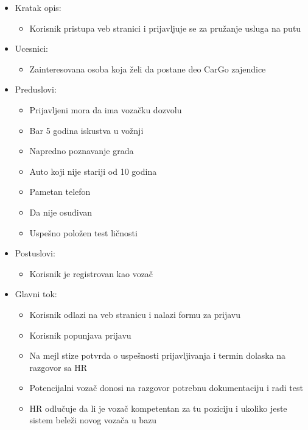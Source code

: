 \begin{itemize}
	\item Kratak opis:
		\begin{itemize}
			\item Korisnik pristupa veb stranici i prijavljuje se za pružanje usluga na putu
		\end{itemize}
 
	\item Ucesnici:
		\begin{itemize}
			\item Zainteresovana osoba koja želi da postane deo CarGo zajendice		
		\end{itemize}				

	\item Preduslovi:
		\begin{itemize}
		    \item Prijavljeni mora da ima vozačku dozvolu
		    \item Bar 5 godina iskustva u vožnji
		    \item Napredno poznavanje grada
		    \item Auto koji nije stariji od 10 godina
		    \item Pametan telefon
		    \item Da nije osuđivan
		    \item Uspešno položen test ličnosti
		\end{itemize}

	\item Postuslovi:
		\begin{itemize}
			\item Korisnik je registrovan kao vozač
		\end{itemize}		


	\item Glavni tok:
		\begin{itemize}
		    \item Korisnik odlazi na veb stranicu i nalazi formu za prijavu
		    \item Korisnik popunjava prijavu
		    \item Na mejl stize potvrda o uspešnosti prijavljivanja i termin dolaska na razgovor sa HR
		    \item Potencijalni vozač donosi na razgovor potrebnu dokumentaciju i radi test
		    \item HR odlučuje da li je vozač kompetentan za tu poziciju i ukoliko jeste sistem beleži novog vozača u bazu
		\end{itemize}


\end{itemize}
